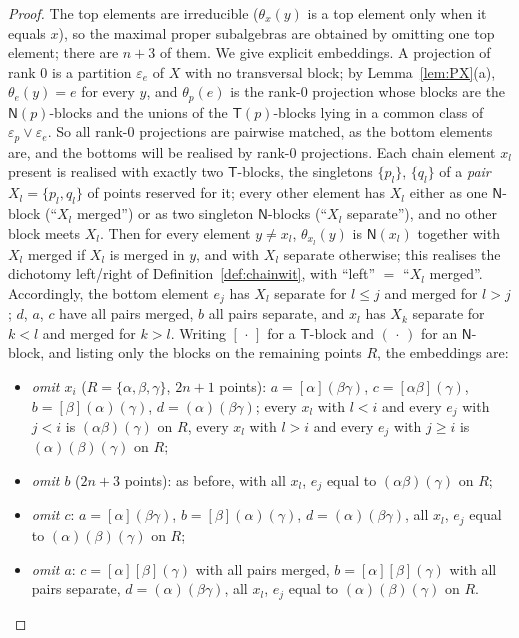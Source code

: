 \documentclass[11pt]{amsart}
\theoremstyle{definition}
\newcommand{\T}{\mathsf{T}}
\newcommand{\N}{\mathsf{N}}
\begin{document}
\begin{proof}
The top elements are irreducible ($\theta_x(y)$ is a top element only when it equals $x$), so the maximal proper subalgebras are obtained by omitting one top element; there are $n+3$ of them. We give explicit embeddings. A projection of rank $0$ is a partition $\varepsilon_e$ of $X$ with no transversal block; by Lemma~\ref{lem:PX}(a), $\theta_e(y)=e$ for every $y$, and $\theta_p(e)$ is the rank-$0$ projection whose blocks are the $\N(p)$-blocks and the unions of the $\T(p)$-blocks lying in a common class of $\varepsilon_p\vee\varepsilon_e$. So all rank-$0$ projections are pairwise matched, as the bottom elements are, and the bottoms will be realised by rank-$0$ projections. Each chain element $x_l$ present is realised with exactly two $\T$-blocks, the singletons $\{p_l\}$, $\{q_l\}$ of a \emph{pair} $X_l=\{p_l,q_l\}$ of points reserved for it; every other element has $X_l$ either as one $\N$-block (``$X_l$ merged'') or as two singleton $\N$-blocks (``$X_l$ separate''), and no other block meets $X_l$. Then for every element $y\ne x_l$, $\theta_{x_l}(y)$ is $\N(x_l)$ together with $X_l$ merged if $X_l$ is merged in $y$, and with $X_l$ separate otherwise; this realises the dichotomy left/right of Definition~\ref{def:chainwit}, with ``left'' $=$ ``$X_l$ merged''. Accordingly, the bottom element $e_j$ has $X_l$ separate for $l\le j$ and merged for $l>j$; $d$, $a$, $c$ have all pairs merged, $b$ all pairs separate, and $x_l$ has $X_k$ separate for $k<l$ and merged for $k>l$. Writing $[\,\cdot\,]$ for a $\T$-block and $(\,\cdot\,)$ for an $\N$-block, and listing only the blocks on the remaining points $R$, the embeddings are:
\begin{itemize}[nosep]
\item \emph{omit $x_i$} ($R=\{\alpha,\beta,\gamma\}$, $2n+1$ points): $a=[\alpha](\beta\gamma)$, $c=[\alpha\beta](\gamma)$, $b=[\beta](\alpha)(\gamma)$, $d=(\alpha)(\beta\gamma)$; every $x_l$ with $l<i$ and every $e_j$ with $j<i$ is $(\alpha\beta)(\gamma)$ on $R$, every $x_l$ with $l>i$ and every $e_j$ with $j\ge i$ is $(\alpha)(\beta)(\gamma)$ on $R$;
\item \emph{omit $b$} ($2n+3$ points): as before, with all $x_l$, $e_j$ equal to $(\alpha\beta)(\gamma)$ on $R$;
\item \emph{omit $c$}: $a=[\alpha](\beta\gamma)$, $b=[\beta](\alpha)(\gamma)$, $d=(\alpha)(\beta\gamma)$, all $x_l$, $e_j$ equal to $(\alpha)(\beta)(\gamma)$ on $R$;
\item \emph{omit $a$}: $c=[\alpha][\beta](\gamma)$ with all pairs merged, $b=[\alpha][\beta](\gamma)$ with all pairs separate, $d=(\alpha)(\beta\gamma)$, all $x_l$, $e_j$ equal to $(\alpha)(\beta)(\gamma)$ on $R$.

\end{itemize}
\end{proof}
\end{document}
